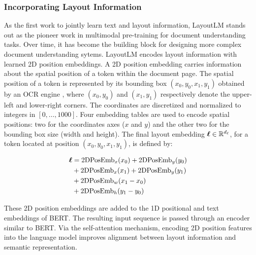 \subsubsection{Incorporating Layout Information} 

As the first work to jointly learn text and layout information, LayoutLM \citep{xu2020layoutlm} stands out as the pioneer work in multimodal pre-training for document understanding tasks. Over time, it has become the building block for designing more complex document understanding sytems. LayoutLM encodes layout information with learned 2D position embeddings. A 2D position embedding carries information about the spatial position of a token within the document page. The spatial position of a token is represented by its bounding box $(x_0, y_0, x_1, y_1)$ obtained by an \ac{OCR} engine \citep{kay2007tesseract}, where $(x_0, y_0)$ and $(x_1, y_1)$ respectively denote the upper-left and lower-right corners. The coordinates are discretized and normalized to integers in $[0, \ldots, 1000]$. Four embedding tables are used to encode spatial positions: two for the coordinates axes ($x$ and $y$) and the other two for the bounding box size (width and height). The final layout embedding $\boldsymbol{\ell} \in \mathbb{R}^{d_{\ell}}$, for a token located at position $(x_0, y_0, x_1, y_1)$, is defined by:

\begin{equation}
\begin{split}
    \boldsymbol{\ell} & = \text{2DPosEmb}_x(x_0) + \text{2DPosEmb}_y(y_0) \\
    & + \text{2DPosEmb}_x(x_1) + \text{2DPosEmb}_y(y_1) \\
    & + \text{2DPosEmb}_w(x_1 - x_0) \\
    & + \text{2DPosEmb}_h(y_1 - y_0) \\
\end{split}
\end{equation}

\noindent These 2D position embeddings are added to the 1D positional and text embeddings of \ac{BERT}. The resulting input sequence is passed through an encoder similar to \ac{BERT}. Via the self-attention mechanism, encoding 2D position features into the language model improves alignment between layout information and semantic representation. 

